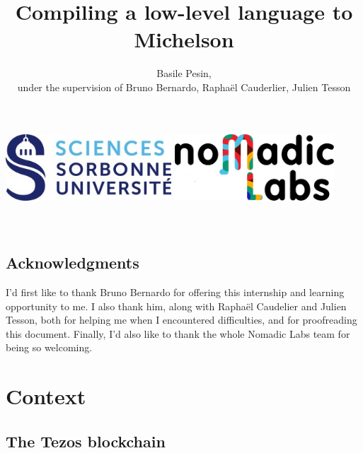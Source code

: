 \documentclass{report}
\title{Compiling a low-level language to Michelson}
\author{Basile Pesin,\\
  under the supervision of Bruno Bernardo, Raphaël Cauderlier, Julien Tesson}
\begin{document}
\makeatletter
    \begin{titlepage}
        \begin{center}
            \includegraphics[height=2.5cm]{ressources/su.jpg}
            \hspace{2cm}
            \includegraphics[height=2.5cm]{ressources/nomadic.png}\\[35ex]
            {\huge \bfseries  \@title }\\[10ex]
            {\large \@author}\\[40ex]
            {\large \@date}
        \end{center}
    \end{titlepage}
\makeatother

\vspace*{\fill}
\begin{center}
\section*{Acknowledgments}
I'd first like to thank Bruno Bernardo for offering this internship and learning opportunity to me. I also thank him, along with Raphaël Caudelier and Julien Tesson, both for helping me when I encountered difficulties, and for proofreading this document. Finally, I'd also like to thank the whole Nomadic Labs team for being so welcoming.
\end{center}
\vspace*{\fill}

\tableofcontents

\chapter*{Context}

\section*{The Tezos blockchain}
\end{document}
